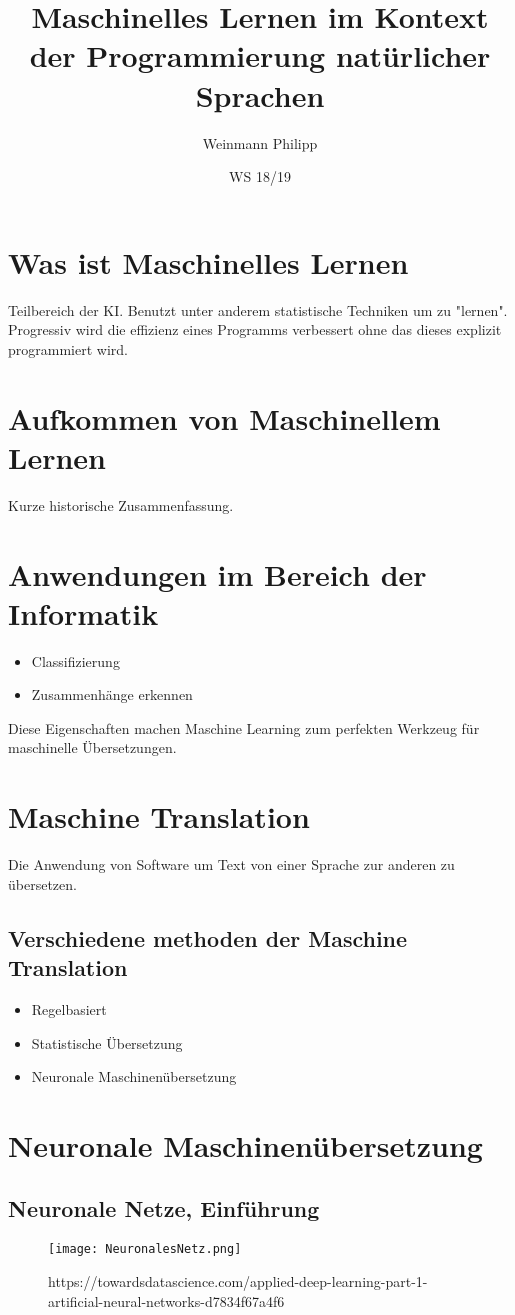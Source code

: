 \documentclass{article}
\title{Maschinelles Lernen im Kontext der Programmierung natürlicher Sprachen}
\date{WS 18/19}
\author{Weinmann Philipp}
\begin{document}
\maketitle
\newpage
\section{Was ist Maschinelles Lernen}
Teilbereich der KI. Benutzt unter anderem statistische Techniken um zu "lernen". Progressiv wird die effizienz eines Programms verbessert ohne das dieses explizit programmiert wird.
\section{Aufkommen von Maschinellem Lernen}
Kurze historische Zusammenfassung.
\section{Anwendungen im Bereich der Informatik	}
\begin{itemize}
	\item Classifizierung
	\item Zusammenhänge erkennen
\end{itemize}
Diese Eigenschaften machen Maschine Learning zum perfekten Werkzeug für maschinelle Übersetzungen.
\section{Maschine Translation}
Die Anwendung von Software um Text von einer Sprache zur anderen zu übersetzen.
\subsection{Verschiedene methoden der Maschine Translation}
\begin{itemize}
	\item Regelbasiert
	\item Statistische Übersetzung
	\item Neuronale Maschinenübersetzung
\end{itemize}
\newpage
\section{Neuronale Maschinenübersetzung}
\subsection{Neuronale Netze, Einführung}
\begin{figure}[h!]
  \texttt{[image: NeuronalesNetz.png]}
  \caption{https://towardsdatascience.com/applied-deep-learning-part-1-artificial-neural-networks-d7834f67a4f6}
  \label{fig:Neuronales Netz}
\end{figure}
\end{document}
